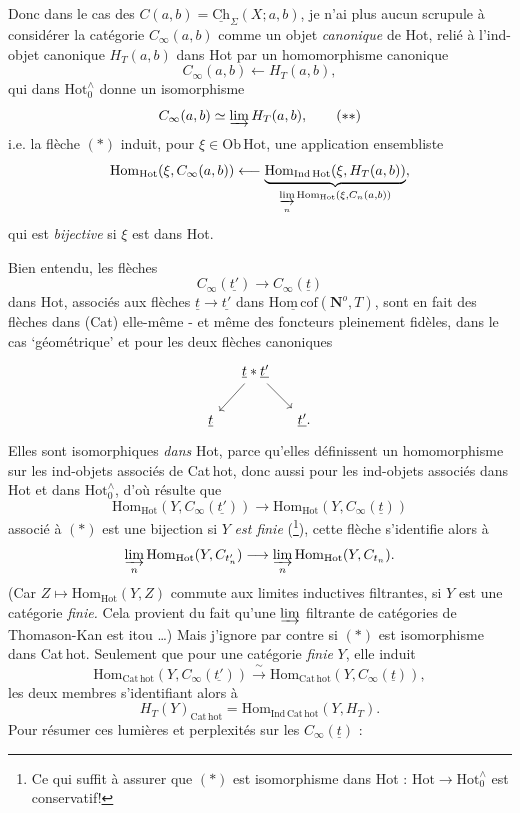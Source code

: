 \documentclass[11pt]{article}
\newcommand{\printedpage}[1]{\marginpar{\footnotesize p.~#1}}
\newcommand{\msp}[1]{\marginpar{\footnotesize [#1]}}
\newcommand{\Hotz}{\mathrm{Hot}^{\wedge}_{0}}
\newcommand{\Hot}{\mathrm{Hot}}
\newcommand{\Hc}{\underline{\mathrm{Hom\,cof}}}
\providecommand{\No}{}\renewcommand{\No}{\mathbf{N}^o}
\begin{document}
Donc dans le cas des $C(a,b) = \underline{\mathrm{Ch}}_\Sigma(X; a, b)$, je n'ai plus aucun scrupule à considérer la catégorie $C_\infty(a,b)$ comme un objet \textit{canonique} de Hot, relié à l'ind-objet canonique $H_T(a,b)$ dans Hot par un homomorphisme canonique
\[
C_\infty(a,b) \longleftarrow H_T(a,b), \tag*{$(*)$}
\]
qui dans $\Hotz$ donne un isomorphisme
\[
C_\infty(a,b) \simeq \varinjlim H_T(a,b), \tag*{$(**)$}
\]
i.e. la flèche $(*)$ induit, pour $\xi \in \mathrm{Ob}\,\Hot$, une application ensembliste
\[
\mathrm{Hom}_{\Hot}(\xi, C_\infty(a,b)) \longleftarrow \underbrace{\mathrm{Hom}_{\mathrm{Ind}\,\Hot}(\xi, H_T(a,b))}_{\underset{n}{\varinjlim}\, \mathrm{Hom}_{\Hot}(\xi, C_n(a,b))},
\]
qui est \textit{bijective} si $\xi$ est dans Hot.

\printedpage{76}
\msp{page 121}
Bien entendu, les flèches
\[
C_\infty(\underline{t'}) \longrightarrow C_\infty(\underline{t}) \tag*{$(*)$}
\]
dans Hot, associés aux flèches $\underline{t} \longrightarrow \underline{t'}$ dans $\Hc(\No, T)$, sont en fait des flèches dans %
(Cat) elle-même - et même des foncteurs pleinement fidèles, dans le cas ‘géométrique’ et pour les deux flèches canoniques
\[
\begin{tikzcd}[column sep=small]
 & \underline{t} * \underline{t'} \arrow[ld] \arrow[rd] & \\
\underline{t} & & \underline{t'}.
\end{tikzcd}
\]
Elles sont isomorphiques \textit{dans} Hot, parce qu'elles définissent un homomorphisme sur les ind-objets associés de Cat\,hot, donc aussi pour les ind-objets associés dans Hot et dans $\Hotz$, d'où résulte que
\[
\mathrm{Hom}_{\Hot}(Y, C_\infty(\underline{t'})) \longrightarrow \mathrm{Hom}_{\Hot}(Y, C_\infty(\underline{t}))
\]
associé à $(*)$ est une bijection si $Y$ \textit{est finie} (\footnote[26]{Ce qui suffit à assurer que $(*)$ est isomorphisme dans Hot : $\Hot \longrightarrow \Hotz$ est conservatif!}), cette flèche s'identifie alors à
\[
\underset{n}{\varinjlim}\, \mathrm{Hom}_{\Hot}(Y, C_{t'_n}) \longrightarrow \underset{n}{\varinjlim}\, \mathrm{Hom}_{\Hot}(Y, C_{t_n}).
\]
(Car $Z \longmapsto \mathrm{Hom}_{\Hot}(Y, Z)$ commute aux limites inductives filtrantes, si $Y$ est une catégorie \textit{finie.} Cela provient du fait qu'une $\varinjlim$ filtrante de catégories de Thomason-Kan est itou \dots) Mais j'ignore par contre si $(*)$ est isomorphisme dans Cat\,hot. Seulement que pour une catégorie \textit{finie} $Y$, elle induit
\[
\mathrm{Hom}_{\mathrm{Cat\,hot}}(Y, C_\infty(\underline{t'})) \xrightarrow{\ \sim\ } \mathrm{Hom}_{\mathrm{Cat\,hot}}(Y, C_\infty(\underline{t})),
\]
les deux membres s'identifiant alors à
\msp{page 122}
\[
H_T(Y)_{\mathrm{Cat\,hot}} = \mathrm{Hom}_{\mathrm{Ind\,Cat\,hot}}(Y, H_T).
\]
Pour résumer ces lumières et perplexités sur les $C_\infty(\underline{t})$ :
\end{document}
